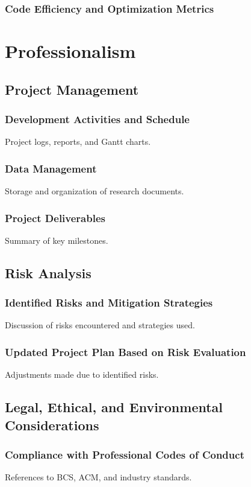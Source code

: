 \documentclass[a4paper,11pt]{report}
\begin{document}
\subsection{Code Efficiency and Optimization Metrics}

\newpage

\chapter{Professionalism}
\section{Project Management}
\subsection{Development Activities and Schedule}
Project logs, reports, and Gantt charts.

\subsection{Data Management}
Storage and organization of research documents.

\subsection{Project Deliverables}
Summary of key milestones.

\section{Risk Analysis}
\subsection{Identified Risks and Mitigation Strategies}
Discussion of risks encountered and strategies used.

\subsection{Updated Project Plan Based on Risk Evaluation}
Adjustments made due to identified risks.

\section{Legal, Ethical, and Environmental Considerations}
\subsection{Compliance with Professional Codes of Conduct}
References to BCS, ACM, and industry standards.
\end{document}
